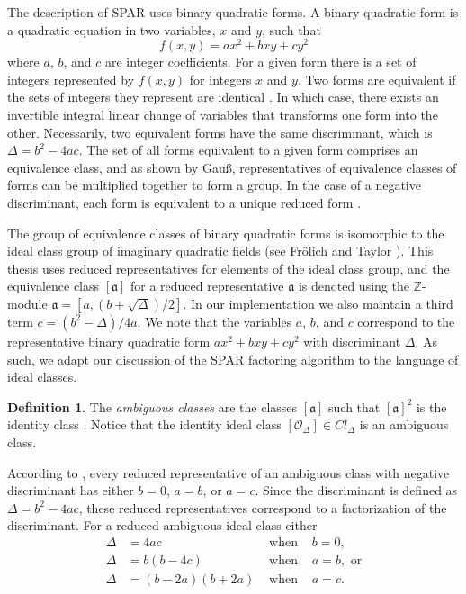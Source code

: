 \documentclass{ucalgthes1}
\theoremstyle{definition}
\newtheorem{defn}[thm]{Definition}
\newcommand{\ZZ}{\mathbb{Z}}
\begin{document}
The description of SPAR uses binary quadratic forms. A binary quadratic form is a quadratic equation in two variables, $x$ and $y$, such that
\[
	f(x, y) = ax^2 + bxy + cy^2
\]
where $a$, $b$, and $c$ are integer coefficients.  For a given form there is a set of integers represented by $f(x, y)$ for integers $x$ and $y$. Two forms are equivalent if the sets of integers they represent are identical \cite[pp.239-240]{Crandall2001}.  In which case, there exists an invertible integral linear change of variables that transforms one form into the other.  Necessarily, two equivalent forms have the same discriminant, which is $\Delta = b^2 - 4ac$.  The set of all forms equivalent to a given form comprises an equivalence class, and as shown by Gau\ss, representatives of equivalence classes of forms can be multiplied together to form a group.  In the case of a negative discriminant, each form is equivalent to a unique reduced form \cite[p.241]{Crandall2001}.  

The group of equivalence classes of binary quadratic forms is isomorphic to the ideal class group of imaginary quadratic fields (see Fr{\"o}lich and Taylor \cite{Frolich1993}).  This thesis uses reduced representatives for elements of the ideal class group, and the equivalence class $[\mathfrak a]$ for a reduced representative $\mathfrak a$ is denoted using the $\ZZ$\mbox{-}module $\mathfrak a = [a, (b + \sqrt\Delta)/2]$.  In our implementation we also maintain a third term $c = (b^2 - \Delta)/4a$.  We note that the variables $a$, $b$, and $c$ correspond to the representative binary quadratic form $ax^2 + bxy + cy^2$ with discriminant $\Delta$. As such, we adapt our discussion of the SPAR factoring algorithm to the language of ideal classes.

\begin{defn}
The \emph{ambiguous classes} are the classes $[\mathfrak a]$ such that ${[\mathfrak a]}^2$ is the identity class \cite[p.302]{Schnorr1984}.  Notice that the identity ideal class $[\mathcal O_\Delta] \in Cl_\Delta$ is an ambiguous class.
\end{defn}

According to \cite[p.303]{Schnorr1984}, every reduced representative of an ambiguous class with negative discriminant has either $b = 0$, $a = b$, or $a = c$.  Since the discriminant is defined as $\Delta = b^2 - 4ac$, these reduced representatives correspond to a factorization of the discriminant.  For a reduced ambiguous ideal class either
\begin{align*}
	\Delta &= 4ac & \textrm{ when } & b = 0, \\
	\Delta &= b(b-4c) & \textrm{ when } & a = b, \textrm{ or} \\
	\Delta &= (b - 2a)(b + 2a) & \textrm{ when } & a = c.
\end{align*}
\end{document}
